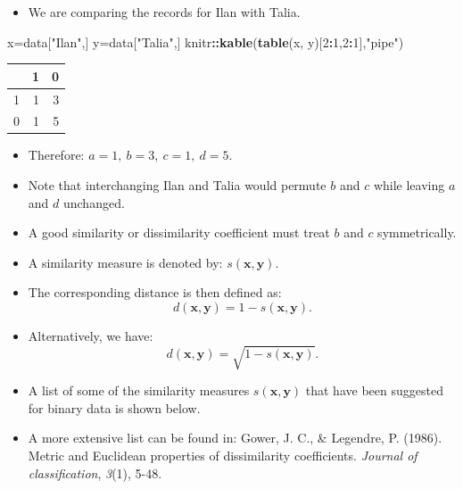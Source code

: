 \documentclass[
]{article}
\newenvironment{Shaded}{\begin{snugshade}}{\end{snugshade}}
\newcommand{\DecValTok}[1]{\textcolor[rgb]{0.00,0.00,0.81}{#1}}
\newcommand{\KeywordTok}[1]{\textcolor[rgb]{0.13,0.29,0.53}{\textbf{#1}}}
\newcommand{\NormalTok}[1]{#1}
\newcommand{\OperatorTok}[1]{\textcolor[rgb]{0.81,0.36,0.00}{\textbf{#1}}}
\newcommand{\StringTok}[1]{\textcolor[rgb]{0.31,0.60,0.02}{#1}}
\providecommand{\tightlist}{%
  \setlength{\itemsep}{0pt}\setlength{\parskip}{0pt}}
\begin{document}
\begin{itemize}
\tightlist
\item
  We are comparing the records for Ilan with Talia.
\end{itemize}

\begin{Shaded}
\begin{Highlighting}[]
\NormalTok{x=data[}\StringTok{"Ilan"}\NormalTok{,]}
\NormalTok{y=data[}\StringTok{"Talia"}\NormalTok{,]}
\NormalTok{knitr}\OperatorTok{::}\KeywordTok{kable}\NormalTok{(}\KeywordTok{table}\NormalTok{(x, y)[}\DecValTok{2}\OperatorTok{:}\DecValTok{1}\NormalTok{,}\DecValTok{2}\OperatorTok{:}\DecValTok{1}\NormalTok{],}\StringTok{"pipe"}\NormalTok{)}
\end{Highlighting}
\end{Shaded}

\begin{longtable}[]{@{}lrr@{}}
\toprule
& 1 & 0\tabularnewline
\midrule
\endhead
1 & 1 & 3\tabularnewline
0 & 1 & 5\tabularnewline
\bottomrule
\end{longtable}

\begin{itemize}
\tightlist
\item
  Therefore: \(a = 1,\:b = 3,\: c = 1,\: d = 5\).
\item
  Note that interchanging Ilan and Talia would permute \(b\) and \(c\)
  while leaving \(a\) and \(d\) unchanged.
\item
  A good similarity or dissimilarity coefficient must treat \(b\) and
  \(c\) symmetrically.
\item
  A similarity measure is denoted by: \(s(\mathbf{x},\mathbf{y})\).
\item
  The corresponding distance is then defined as:
  \[d(\mathbf{x},\mathbf{y})=1-s(\mathbf{x},\mathbf{y}).\]
\item
  Alternatively, we have:
  \[d(\mathbf{x},\mathbf{y})=\sqrt{1-s(\mathbf{x},\mathbf{y})}.\]
\item
  A list of some of the similarity measures \(s(\mathbf{x},\mathbf{y})\)
  that have been suggested for binary data is shown below.
\item
  A more extensive list can be found in: Gower, J. C., \& Legendre, P.
  (1986). Metric and Euclidean properties of dissimilarity coefficients.
  \emph{Journal of classification}, \emph{3}(1), 5-48.
\end{itemize}
\end{document}
